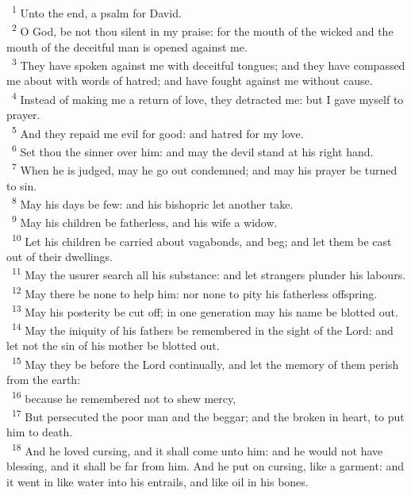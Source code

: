 \documentclass[a5paper,12pt]{article}
\begin{document}
\begin{multicols*}{2}
~\textsuperscript{1} Unto the end, a psalm for David.\\
~\textsuperscript{2} O God, be not thou silent in my praise: for the mouth of the wicked and the mouth of the deceitful man is opened against me.\\
~\textsuperscript{3} They have spoken against me with deceitful tongues; and they have compassed me about with words of hatred; and have fought against me without cause.\\
~\textsuperscript{4} Instead of making me a return of love, they detracted me: but I gave myself to prayer.\\
~\textsuperscript{5} And they repaid me evil for good: and hatred for my love.\\
~\textsuperscript{6} Set thou the sinner over him: and may the devil stand at his right hand.\\
~\textsuperscript{7} When he is judged, may he go out condemned; and may his prayer be turned to sin.\\
~\textsuperscript{8} May his days be few: and his bishopric let another take.\\
~\textsuperscript{9} May his children be fatherless, and his wife a widow.\\
~\textsuperscript{10} Let his children be carried about vagabonds, and beg; and let them be cast out of their dwellings.\\
~\textsuperscript{11} May the usurer search all his substance: and let strangers plunder his labours.\\
~\textsuperscript{12} May there be none to help him: nor none to pity his fatherless offspring.\\
~\textsuperscript{13} May his posterity be cut off; in one generation may his name be blotted out.\\
~\textsuperscript{14} May the iniquity of his fathers be remembered in the sight of the Lord: and let not the sin of his mother be blotted out.\\
~\textsuperscript{15} May they be before the Lord continually, and let the memory of them perish from the earth:\\
~\textsuperscript{16} because he remembered not to shew mercy,\\
~\textsuperscript{17} But persecuted the poor man and the beggar; and the broken in heart, to put him to death.\\
~\textsuperscript{18} And he loved cursing, and it shall come unto him: and he would not have blessing, and it shall be far from him. And he put on cursing, like a garment: and it went in like water into his entrails, and like oil in his bones.\\

\end{multicols*}
\end{document}
